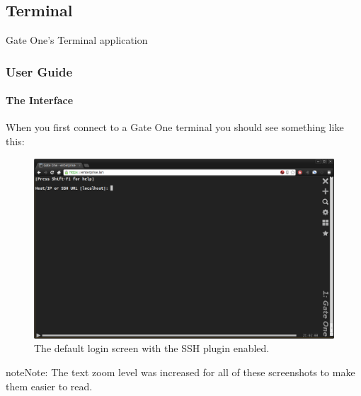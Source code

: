 \documentclass[letterpaper,10pt,openany]{sphinxmanual}
\begin{document}
\subsection{Terminal}
\label{Applications/terminal/index:terminal}\label{Applications/terminal/index::doc}
Gate One's Terminal application


\subsubsection{User Guide}
\label{Applications/terminal/userguide:user-guide}\label{Applications/terminal/userguide::doc}

\paragraph{The Interface}
\label{Applications/terminal/userguide:the-interface}
When you first connect to a Gate One terminal you should see something like this:
\begin{figure}[htbp]
\centering
\capstart

\includegraphics{gateone_login.png}
\caption{The default login screen with the SSH plugin enabled.}\end{figure}

\begin{notice}{note}{Note:}
The text zoom level was increased for all of these screenshots to make them easier to read.
\end{notice}
\end{document}
